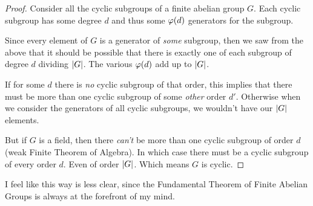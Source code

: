 \begin{proof}
  Consider all the cyclic subgroups of a finite abelian group $G$. Each
  cyclic subgroup has some degree $d$ and thus some $\varphi\mathopen{}\left( {d} \right)\mathclose{}$
  generators for the subgroup.

  Since every element of $G$ is a generator of \emph{some} subgroup,
  then we saw from the above that it should be possible that there is
  exactly one of each subgroup of degree $d$ dividing $|G|$. The
  various $\varphi\mathopen{}\left( {d} \right)\mathclose{}$ add up to $|G|$.

  If for some $d$ there is \emph{no} cyclic subgroup of that order, this
  implies that there must be more than one cyclic subgroup of some
  \emph{other} order $d'$. Otherwise when we consider the generators of
  all cyclic subgroups, we wouldn't have our $|G|$ elements.

  But if $G$ is a field, then there \emph{can't} be more than one cyclic
  subgroup of order $d$ (weak Finite Theorem of Algebra). In which case
  there must be a cyclic subgroup of every order $d$. Even of order
  $|G|$. Which means $G$ is cyclic.
\end{proof}

\begin{remark}
  I feel like this way is less clear, since the Fundamental Theorem of
  Finite Abelian Groups is always at the forefront of my mind.
\end{remark}

